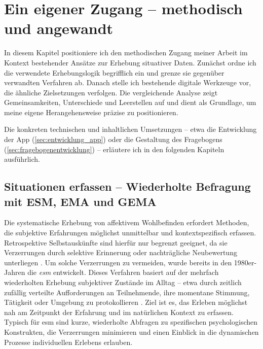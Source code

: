 
\chapter{Ein eigener Zugang -- methodisch und angewandt} \label{sec:methodik}

In diesem Kapitel positioniere ich den methodischen Zugang meiner Arbeit im Kontext bestehender Ansätze zur Erhebung situativer Daten. Zunächst ordne ich die verwendete Erhebungslogik begrifflich ein und grenze sie gegenüber verwandten Verfahren ab. Danach stelle ich bestehende digitale Werkzeuge vor, die ähnliche Zielsetzungen verfolgen. Die vergleichende Analyse zeigt Gemeinsamkeiten, Unterschiede und Leerstellen auf und dient als Grundlage, um meine eigene Herangehensweise präzise zu positionieren.

Die konkreten technischen und inhaltlichen Umsetzungen -- etwa die Entwicklung der App (\cref{sec:entwicklung_app}) oder die Gestaltung des Fragebogens (\cref{sec:fragebogenentwicklung}) -- erläutere ich in den folgenden Kapiteln ausführlich.



\section{Situationen erfassen -- Wiederholte Befragung mit ESM, EMA und GEMA}

Die systematische Erhebung von affektivem Wohlbefinden erfordert Methoden, die subjektive Erfahrungen möglichst unmittelbar und kontextspezifisch erfassen. Retrospektive Selbstauskünfte sind hierfür nur begrenzt geeignet, da sie Verzerrungen durch selektive Erinnerung oder nachträgliche Neubewertung unterliegen \parencite[\textit{Recall Bias} \gls{vgl},][]{kahnemanDevelopmentsMeasurementSubjective2006}. Um solche Verzerrungen zu vermeiden, wurde bereits in den 1980er-Jahren die \emph{\acrfull{esm}} entwickelt. Dieses Verfahren basiert auf der mehrfach wiederholten Erhebung subjektiver Zustände im Alltag -- etwa durch zeitlich zufällig verteilte Aufforderungen an Teilnehmende, ihre momentane Stimmung, Tätigkeit oder Umgebung zu protokollieren \parencite{csikszentmihalyiValidityReliabilityExperienceSampling1987}. Ziel ist es, das Erleben möglichst nah am Zeitpunkt der Erfahrung und im natürlichen Kontext zu erfassen. Typisch für \acrshort{esm} sind kurze, wiederholte Abfragen zu spezifischen psychologischen Konstrukten, die Verzerrungen minimieren und einen Einblick in die dynamischen Prozesse individuellen Erlebens erlauben.

